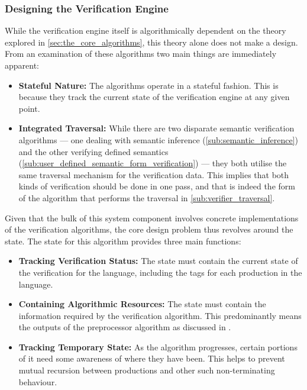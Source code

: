 
\subsubsection{Designing the Verification Engine} %
\label{ssub:designing_the_verification_engine}
While the verification engine itself is algorithmically dependent on the theory explored in \autoref{sec:the_core_algorithms}, this theory alone does not make a design. 
From an examination of these algorithms two main things are immediately apparent:
\begin{itemize}
    \item \textbf{Stateful Nature:} The algorithms operate in a stateful fashion.
    This is because they track the current state of the verification engine at any given point.
    \item \textbf{Integrated Traversal:} While there are two disparate semantic verification algorithms --- one dealing with semantic inference (\autoref{sub:semantic_inference}) and the other verifying defined semantics (\autoref{sub:user_defined_semantic_form_verification}) --- they both utilise the same traversal mechanism for the verification data. 
    This implies that both kinds of verification should be done in one pass, and that is indeed the form of the algorithm that performs the traversal in \autoref{sub:verifier_traversal}. 
\end{itemize}

Given that the bulk of this system component involves concrete implementations of the verification algorithms, the core design problem thus revolves around the state. 
The state for this algorithm provides three main functions:
\begin{itemize}
    \item \textbf{Tracking Verification Status:} The state must contain the current state of the verification for the language, including the tags for each production in the language.
    \item \textbf{Containing Algorithmic Resources:} The state must contain the information required by the verification algorithm.
    This predominantly means the outputs of the preprocessor algorithm as discussed in .
    \item \textbf{Tracking Temporary State:} As the algorithm progresses, certain portions of it need some awareness of where they have been.
    This helps to prevent mutual recursion between productions and other such non-terminating behaviour. 
\end{itemize}

